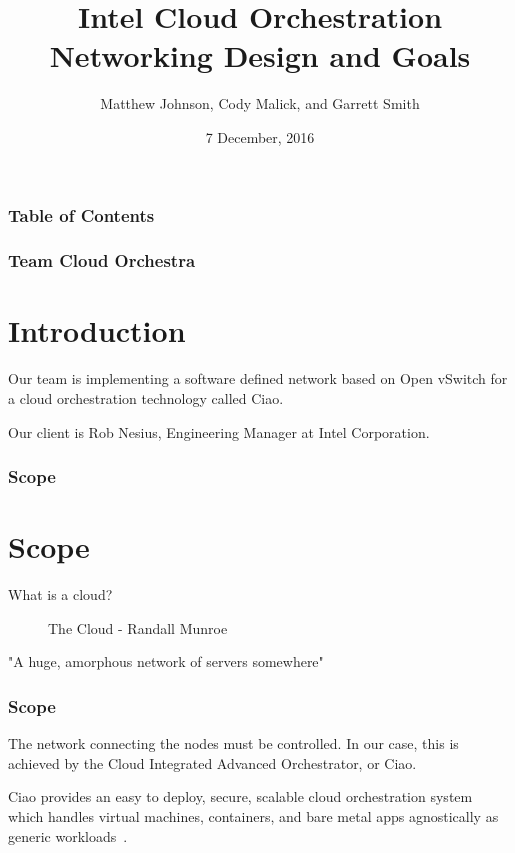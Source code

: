 \documentclass[pdf]{beamer}
\begin{document}
\title{Intel Cloud Orchestration Networking Design and Goals}
\author{Matthew Johnson, Cody Malick, and Garrett Smith}
\date{7 December, 2016}

\maketitle
\begin{frame}
	\frametitle{Table of Contents}
	\tableofcontents
\end{frame}

\begin{frame}
	\frametitle{Team Cloud Orchestra}
	\section{Introduction}
	Our team is implementing a software defined network based on Open
	vSwitch for a cloud orchestration technology called Ciao.

	Our client is Rob Nesius, Engineering Manager at Intel Corporation.
\end{frame}

\begin{frame}
	\frametitle{Scope}
	\section{Scope}
	What is a cloud?
	\begin{figure}[H]
		\caption{The Cloud - Randall Munroe~\cite{xkcd908}}
		\begin{center}
		\end{center}
	\end{figure}

	"A huge, amorphous network of servers somewhere"

\end{frame}

\begin{frame}
	\frametitle{Scope}
	The network connecting the nodes must be controlled. In our case, this
	is achieved by the Cloud Integrated Advanced Orchestrator, or Ciao.

	Ciao provides an easy to deploy, secure, scalable cloud orchestration
	system which handles virtual machines, containers, and bare metal apps
	agnostically as generic workloads~\cite{ciao}.
\end{frame}
\end{document}
